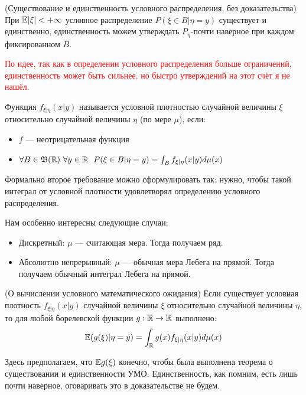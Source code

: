 \begin{theorem} (Существование и единственность условного распределения, без доказательства)
    При $\mathbb{E}|\xi| < +\infty$ условное распределение $P(\xi \in B | \eta = y)$ существует и единственно, единственность можем утверждать $P_\eta$-почти наверное при каждом фиксированном $B$.
\end{theorem}

\textcolor{red}{По идее, так как в определении условного распределения больше ограничений, единственность может быть сильнее, но быстро утверждений на этот счёт я не нашёл.}

\begin{definition}
    Функция $f_{\xi | \eta}(x | y)$ называется условной плотностью случайной величины $\xi$ относительно случайной величины $\eta$ (по мере $\mu$), если:
    \begin{itemize}
    	\item $f$ --- неотрицательная функция
    	
    	\item $\forall B \in \mathfrak{B}(\mathbb{R})\ \forall y \in \mathbb{R}\ \ P(\xi \in B | \eta = y) = \int_B f_{\xi | \eta}(x | y)d\mu(x)$
    \end{itemize}
\end{definition}

\begin{note}
	Формально второе требование можно сформулировать так: нужно, чтобы такой интеграл от условной плотности удовлетворял определению условного распределения.
\end{note}

\begin{note}
    Нам особенно интересны следующие случаи:
    \begin{itemize}
        \item Дискретный: $\mu$ --- считающая мера. Тогда получаем ряд.
        
        \item Абсолютно непрерывный: $\mu$ --- обычная мера Лебега на прямой. Тогда получаем обычный интеграл Лебега на прямой.
    \end{itemize}
\end{note}

\begin{theorem} (О вычислении условного математического ожидания)
    Если существует условная плотность $f_{\xi | \eta}(x | y)$ случайной величины $\xi$ относительно случайной величины $\eta$, то для любой борелевской функции $g: \mathbb{R} \to \mathbb{R}$ выполнено:
    \[
        \mathbb{E}(g(\xi) | \eta = y) = \int_{\mathbb{R}} g(x) f_{\xi | \eta}(x | y) d\mu(x)
    \]

    Здесь предполагаем, что $\mathbb{E} g(\xi)$ конечно, чтобы была выполнена теорема о существовании и единственности УМО. Единственность, как помним, есть лишь почти наверное, оговаривать это в доказательстве не будем.
\end{theorem}

